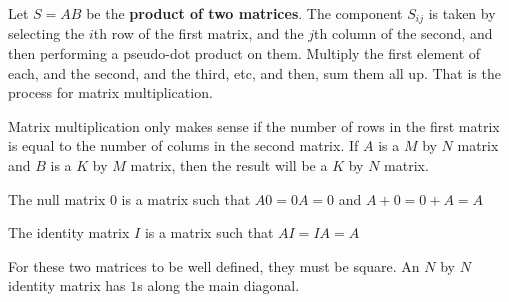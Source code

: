 \documentclass{article}
\begin{document}
\begin{definition}
Let $S = AB$ be the \textbf{product of two matrices}. The component $S_{ij}$ is taken by selecting the $i$th row of the first matrix, and the $j$th column of the second, and then performing a pseudo-dot product on them. Multiply the first element of each, and the second, and the third, etc, and then, sum them all up. That is the process for matrix multiplication.
\end{definition}

Matrix multiplication only makes sense if the number of rows in the first matrix is equal to the number of colums in the second matrix. If $A$ is a $M$ by $N$ matrix and $B$ is a $K$ by $M$ matrix, then the result will be a $K$ by $N$ matrix.
\begin{definition}
The null matrix $0$ is a matrix such that $A0 = 0A = 0$ and $A + 0 = 0 + A = A$

The identity matrix $I$ is a matrix such that $AI = IA = A$

For these two matrices to be well defined, they must be square. An $N$ by $N$ identity matrix has $1$s along the main diagonal. 
\end{definition}
\end{document}

